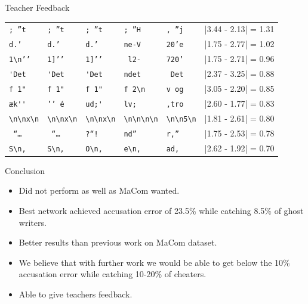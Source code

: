 \documentclass[10pt]{beamer}
\begin{document}
\begin{frame}[fragile]{Teacher Feedback}
\begin{center}
\begin{tabular}{lll|lll}
            \verb[; ”t[       & \verb[; ”t[       & \verb[; ”t[          &
            \verb'; ”H'       & \verb', ”j'       & |3.44 - 2.13| = 1.31 \\

            \verb[d.’ [       & \verb[d.’ [       & \verb[d.’ [          &
            \verb'ne-V'       & \verb'20’e'       & |1.75 - 2.77| = 1.02 \\

            \verb[1\n’’[      & \verb[1]’’[       & \verb[1]’’[          &
            \verb' l2-'       & \verb'720’'       & |1.75 - 2.71| = 0.96 \\

            \verb['Det[       & \verb['Det[       & \verb['Det[          &
            \verb'ndet'       & \verb' Det'       & |2.37 - 3.25| = 0.88 \\

            \verb[f 1"[       & \verb[f 1"[       & \verb[f 1"[          &
            \verb'f 2\n'      & \verb'v og'       & |3.05 - 2.20| = 0.85 \\

            \verb[æk''[       & \verb[’’ é[       & \verb[ud;'[          &
            \verb'lv; '       & \verb',tro'       & |2.60 - 1.77| = 0.83 \\

            \verb[\n\nx\n[    & \verb[\n\nx\n[    & \verb[\n\nx\n[       &
            \verb'\n\n\n\n'   & \verb'\n\n5\n'    & |1.81 - 2.61| = 0.80 \\
            \verb[ “… [       & \verb[ “… [       & \verb[?“! [          &
            \verb'nd” '       & \verb'r,” '       & |1.75 - 2.53| = 0.78 \\

            \verb[S\n, [      & \verb[S\n, [      & \verb[O\n, [         &
            \verb'e\n, '      & \verb'ad, '       & |2.62 - 1.92| = 0.70 \\
        \end{tabular}
    \end{center}
\end{frame}

\begin{frame}[fragile]{Conclusion}
    \begin{itemize}
        \item Did not perform as well as MaCom wanted.
        \item Best network achieved accusation error of 23.5\% while catching
            8.5\% of ghost writers.
        \item Better results than previous work on MaCom dataset.
        \item We believe that with further work we would be able to get below
            the 10\% accusation error while catching 10-20\% of cheaters.
        \item Able to give teachers feedback.
    \end{itemize}
\end{frame}
\end{document}
